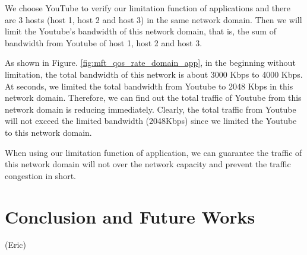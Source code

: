 \documentclass[journal]{IEEEtran}
\begin{document}
We choose YouTube to verify our limitation function of applications and there are 3 hosts (host 1, host 2 and host 3) in the same network domain. Then we will limit the Youtube’s bandwidth of this network domain, that is, the sum of bandwidth from Youtube of host 1, host 2 and host 3.

As shown in Figure. \ref{fig:mft_qos_rate_domain_app}, in the beginning without limitation, the total bandwidth of this network is about 3000 Kbps to 4000 Kbps. At  seconds, we limited the total bandwidth from Youtube to 2048 Kbps in this network domain. Therefore, we can find out the total traffic of Youtube from this network domain is reducing immediately. Clearly, the total traffic from Youtube will not exceed the limited bandwidth (2048Kbps) since we limited the Youtube to this network domain.

When using our limitation function of application, we can guarantee the traffic of this network domain will not over the network capacity and prevent the traffic congestion in short.



\section{Conclusion and Future Works}
(Eric)



\newpage


\end{document}
